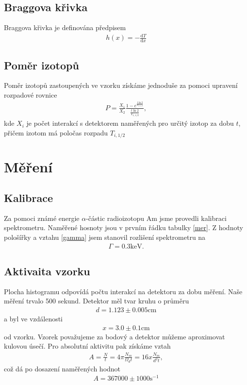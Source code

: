 \documentclass[a4paper,12pt]{article}
\renewcommand{\d}{\mbox{d}}
\begin{document}
\subsection{Braggova křivka}
Braggova křivka je definována předpisem
\begin{eqnarray}
h(x)=-\frac{\d T}{\d x}
\label{bragg}
\end{eqnarray}

\subsection{Poměr izotopů}
Poměr izotopů zastoupených ve vzorku získáme jednoduše za pomoci upravení rozpadové rovnice
\begin{eqnarray}
P=\frac{X_1}{X_2}\frac{1-e^{\frac{t\ln 2}{T_{2,1/2}}}}{\frac{t\ln 2}{T_{1,1/2}}},
\label{p}
\end{eqnarray}
kde $X_i$ je počet interakcí s detektorem naměřených pro určitý izotop za dobu $t$, přičem izotom 
má poločas rozpadu $T_{i,1/2}$


\section{Měření}
\subsection{Kalibrace}
Za pomoci známé energie $\alpha$-částic radioizotopu Am jsme provedli kalibraci spektrometru. Naměřené hosnoty jsou v prvním řádku tabulky \ref{mer}. 
Z hodnoty pološířky a vztahu \ref{gamma} jsem stanovil rozlišení spektrometru na
\begin{eqnarray}
\Gamma = 0.3 \mbox{keV}.
\end{eqnarray}

\subsection{Aktivaita vzorku}
Plocha histogramu odpovídá počtu interakcí na detektoru za dobu měření. Naše měření trvalo 500 sekund. Detektor měl tvar kruhu o průměru 
\begin{eqnarray}
d=1.123\pm0.005 \mbox{cm}
\end{eqnarray}
a byl ve vzdálenosti
\begin{eqnarray}
x=3.0\pm0.1 \mbox{cm}
\end{eqnarray}
od vzorku. Vzorek považujeme za bodový a detektor můžeme aproximovat kulovou úsečí. Pro absolutní aktivitu pak získáme vztah
\begin{eqnarray}
A=\frac{N}{t}=4\pi\frac{N_m}{\Omega_dt}=16x\frac{N_m}{d^2t},
\end{eqnarray}
což dá po dosazení naměřených hodnot
\begin{eqnarray}
A=367000\pm1000 \mbox{s}^{-1}
\end{eqnarray}
\end{document}
